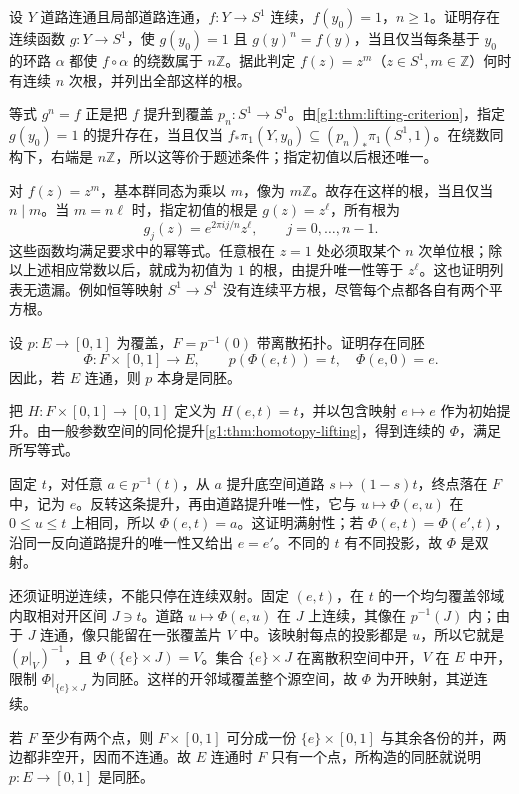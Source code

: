 \begin{exercise}\label{g1:ex:continuous-circle-root}
	设 \(Y\) 道路连通且局部道路连通，\(f:Y\to S^1\) 连续，\(f(y_0)=1\)，\(n\ge1\)。证明存在连续函数 \(g:Y\to S^1\)，使 \(g(y_0)=1\) 且 \(g(y)^n=f(y)\)，当且仅当每条基于 \(y_0\) 的环路 \(\alpha\) 都使 \(f\circ\alpha\) 的绕数属于 \(n\mathbb Z\)。据此判定 \(f(z)=z^m\)（\(z\in S^1,m\in\mathbb Z\)）何时有连续 \(n\) 次根，并列出全部这样的根。
\end{exercise}
\begin{solution}
	等式 \(g^n=f\) 正是把 \(f\) 提升到覆盖 \(p_n:S^1\to S^1\)。由\cref{g1:thm:lifting-criterion}，指定 \(g(y_0)=1\) 的提升存在，当且仅当 \(f_*\pi_1(Y,y_0)\subseteq(p_n)_*\pi_1(S^1,1)\)。在绕数同构下，右端是 \(n\mathbb Z\)，所以这等价于题述条件；指定初值以后根还唯一。

	对 \(f(z)=z^m\)，基本群同态为乘以 \(m\)，像为 \(m\mathbb Z\)。故存在这样的根，当且仅当 \(n\mid m\)。当 \(m=n\ell\) 时，指定初值的根是 \(g(z)=z^\ell\)，所有根为
	\[
		g_j(z)=e^{2\pi ij/n}z^\ell,\qquad j=0,\ldots,n-1.
	\]
	这些函数均满足要求中的幂等式。任意根在 \(z=1\) 处必须取某个 \(n\) 次单位根；除以上述相应常数以后，就成为初值为 \(1\) 的根，由提升唯一性等于 \(z^\ell\)。这也证明列表无遗漏。例如恒等映射 \(S^1\to S^1\) 没有连续平方根，尽管每个点都各自有两个平方根。
\end{solution}

\begin{exercise}\label{g1:ex:interval-cover-trivial}
	设 \(p:E\to[0,1]\) 为覆盖，\(F=p^{-1}(0)\) 带离散拓扑。证明存在同胚
	\[
		\Phi:F\times[0,1]\longrightarrow E,\qquad
		p(\Phi(e,t))=t,\quad \Phi(e,0)=e.
	\]
	因此，若 \(E\) 连通，则 \(p\) 本身是同胚。
\end{exercise}
\begin{solution}
	把 \(H:F\times[0,1]\to[0,1]\) 定义为 \(H(e,t)=t\)，并以包含映射 \(e\mapsto e\) 作为初始提升。由一般参数空间的同伦提升\cref{g1:thm:homotopy-lifting}，得到连续的 \(\Phi\)，满足所写等式。

	固定 \(t\)，对任意 \(a\in p^{-1}(t)\)，从 \(a\) 提升底空间道路 \(s\mapsto(1-s)t\)，终点落在 \(F\) 中，记为 \(e\)。反转这条提升，再由道路提升唯一性，它与 \(u\mapsto\Phi(e,u)\) 在 \(0\le u\le t\) 上相同，所以 \(\Phi(e,t)=a\)。这证明满射性；若 \(\Phi(e,t)=\Phi(e',t)\)，沿同一反向道路提升的唯一性又给出 \(e=e'\)。不同的 \(t\) 有不同投影，故 \(\Phi\) 是双射。

	还须证明逆连续，不能只停在连续双射。固定 \((e,t)\)，在 \(t\) 的一个均匀覆盖邻域内取相对开区间 \(J\ni t\)。道路 \(u\mapsto\Phi(e,u)\) 在 \(J\) 上连续，其像在 \(p^{-1}(J)\) 内；由于 \(J\) 连通，像只能留在一张覆盖片 \(V\) 中。该映射每点的投影都是 \(u\)，所以它就是 \((p|_V)^{-1}\)，且 \(\Phi(\{e\}\times J)=V\)。集合 \(\{e\}\times J\) 在离散积空间中开，\(V\) 在 \(E\) 中开，限制 \(\Phi|_{\{e\}\times J}\) 为同胚。这样的开邻域覆盖整个源空间，故 \(\Phi\) 为开映射，其逆连续。

	若 \(F\) 至少有两个点，则 \(F\times[0,1]\) 可分成一份 \(\{e\}\times[0,1]\) 与其余各份的并，两边都非空开，因而不连通。故 \(E\) 连通时 \(F\) 只有一个点，所构造的同胚就说明 \(p:E\to[0,1]\) 是同胚。
\end{solution}

